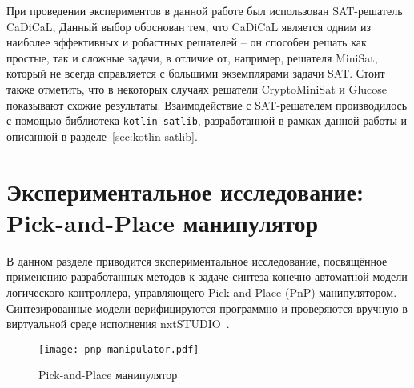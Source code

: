 При проведении экспериментов в данной работе был использован SAT-решатель CaDiCaL,
Данный выбор обоснован тем, что CaDiCaL является одним из наиболее эффективных и робастных решателей \--- он способен решать как простые, так и сложные задачи, в отличие от, например, решателя MiniSat, который не всегда справляется с большими экземплярами задачи SAT.
Стоит также отметить, что в некоторых случаях решатели Crypto\-MiniSat и Glucose показывают схожие результаты.
Взаимодействие с SAT-решателем производилось с помощью библиотека \texttt{kotlin-satlib}, разработанной в рамках данной работы и описанной в разделе~\ref{sec:kotlin-satlib}.


\section{Экспериментальное исследование: Pick-and-Place манипулятор}
\label{sec:experiments-pnp}

В данном разделе приводится экспериментальное исследование, посвящённое применению разработанных методов к задаче синтеза конечно-автоматной модели логического контроллера, управляющего Pick-and-Place (PnP) манипулятором.
Синтезированные модели верифицируются программно и проверяются вручную в виртуальной среде исполнения nxtSTUDIO~\cite{nxtstudio}.

\begin{figure}[!htb]
    \centering
    \texttt{[image: pnp-manipulator.pdf]}
    \caption{Pick-and-Place манипулятор}
    \label{fig:pnp-manipulator}
\end{figure}

